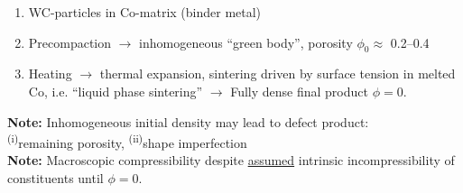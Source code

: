 \documentclass[11pt]{beamer} %
\renewcommand{\alert}[1]{\textbf{#1}}
\begin{document}
\begin{frame}
 \begin{enumerate}
  \item WC-particles in Co-matrix (binder metal)
  \item Precompaction $\rightarrow$ inhomogeneous ``green body'', porosity $\phi_0\approx$ 0.2--0.4
  \item Heating $\rightarrow$ thermal expansion, sintering driven by surface tension in melted Co, i.e. ``liquid phase sintering'' $\rightarrow$
        Fully dense final product $\phi=0$.
 \end{enumerate}
\alert{Note:} Inhomogeneous initial density may lead to defect product:\\ \textsuperscript{(i)}remaining porosity, \textsuperscript{(ii)}shape imperfection\\
\alert{Note:} Macroscopic compressibility despite \underline{assumed} intrinsic incompressibility of constituents until $\phi = 0$.
\begin{center}
 \begin{columns}
 \centering
\end{columns}
\end{center}
\end{frame}
\end{document}
